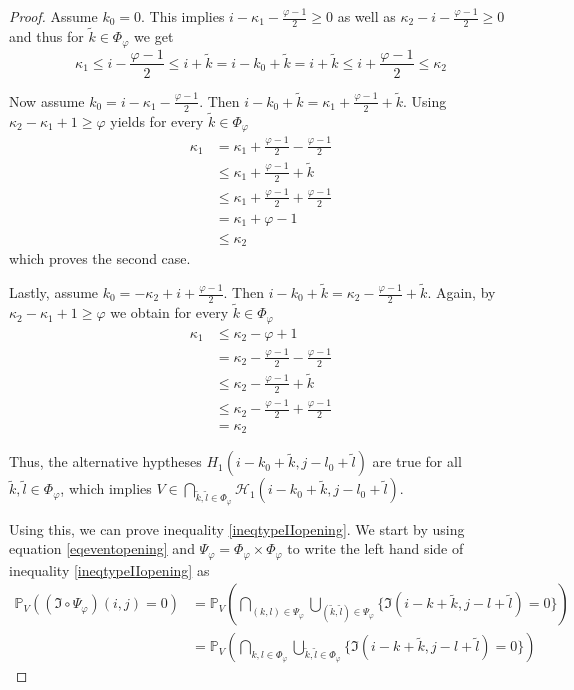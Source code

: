 \documentclass[a4paper,12pt]{article}
\theoremstyle{plain}
\theoremstyle{definition}
\begin{document}
\begin{proof}
	Assume $k_0 = 0$. This implies $i - \kappa_1 - \frac{\varphi - 1}{2} \geq 0$ as well as $\kappa_2 - i - \frac{\varphi - 1}{2} \geq 0$ and thus for $\tilde{k} \in \Phi_\varphi$ we get
	\begin{equation*}
		\kappa_1 \leq i - \frac{\varphi - 1}{2} \leq i + \tilde{k} = i - k_0 + \tilde{k} = i + \tilde{k} \leq i + \frac{\varphi - 1}{2} \leq \kappa_2
	\end{equation*}
	
	Now assume $k_0 = i - \kappa_1 - \frac{\varphi - 1}{2}$. Then $i - k_0 + \tilde{k} = \kappa_1 + \frac{\varphi - 1}{2} + \tilde{k}$. Using $\kappa_2 - \kappa_1 + 1 \geq \varphi$ yields for every $\tilde{k} \in \Phi_\varphi$
	\begin{align*}
		\kappa_1 &= \kappa_1 + \frac{\varphi - 1}{2} - \frac{\varphi - 1}{2} \\
		&\leq \kappa_1 + \frac{\varphi - 1}{2} + \tilde{k} \\
		&\leq \kappa_1 + \frac{\varphi - 1}{2} + \frac{\varphi - 1}{2} \\
		&= \kappa_1 + \varphi - 1 \\
		&\leq \kappa_2
	\end{align*}
	which proves the second case.
	
	Lastly, assume $k_0 = - \kappa_2 + i + \frac{\varphi - 1}{2}$. Then $i - k_0 + \tilde{k} = \kappa_2 - \frac{\varphi - 1}{2} + \tilde{k}$. Again, by $\kappa_2 - \kappa_1 + 1 \geq \varphi$ we obtain for every $\tilde{k} \in \Phi_\varphi$
	\begin{align*}
		\kappa_1 &\leq \kappa_2 - \varphi + 1 \\
		&= \kappa_2 - \frac{\varphi - 1}{2} - \frac{\varphi - 1}{2} \\
		&\leq \kappa_2 - \frac{\varphi - 1}{2} + \tilde{k} \\
		&\leq \kappa_2 - \frac{\varphi - 1}{2} + \frac{\varphi - 1}{2} \\
		&= \kappa_2
	\end{align*}
	
	Thus, the alternative hyptheses $H_1(i - k_0 + \tilde{k}, j - l_0 + \tilde{l})$ are true for all $\tilde{k}, \tilde{l} \in \Phi_\varphi$, which implies $V \in \bigcap_{\tilde{k}, \tilde{l} \in \Phi_\varphi} \mathcal{H}_1(i - k_0 + \tilde{k}, j - l_0 + \tilde{l})$.
	
	Using this, we can prove inequality \eqref{ineqtypeIIopening}. We start by using equation \eqref{eqeventopening} and $\Psi_\varphi = \Phi_\varphi \times \Phi_\varphi$ to write the left hand side of inequality \eqref{ineqtypeIIopening} as
	\begin{align*}
		\mathbb{P}_V( (\mathfrak{I} \circ \Psi_\varphi)(i, j) = 0 ) &= \mathbb{P}_V\left( \bigcap_{(k, l) \in \Psi_\varphi} \bigcup_{(\tilde{k}, \tilde{l}) \in \Psi_\varphi} \{ \mathfrak{I}(i - k + \tilde{k}, j - l + \tilde{l}) = 0 \} \right) \\
		&= \mathbb{P}_V\left( \bigcap_{k, l \in \Phi_\varphi} \bigcup_{\tilde{k}, \tilde{l} \in \Phi_\varphi} \{ \mathfrak{I}(i - k + \tilde{k}, j - l + \tilde{l}) = 0 \} \right)
	\end{align*}
	

\end{proof}
\end{document}
